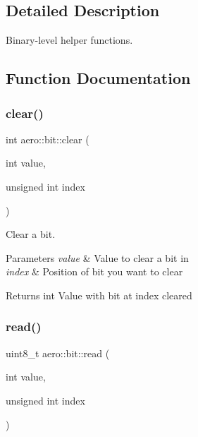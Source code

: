 \subsection{Detailed Description}
Binary-\/level helper functions. 

\subsection{Function Documentation}
\mbox{\label{namespaceaero_1_1bit_a4eed338c347ab1ec13345717315fbf30}} 
\subsubsection{\texorpdfstring{clear()}{clear()}}
{\footnotesize\ttfamily int aero\+::bit\+::clear (\begin{DoxyParamCaption}\item[{int}]{value,  }\item[{unsigned int}]{index }\end{DoxyParamCaption})}



Clear a bit. 


\begin{DoxyParams}{Parameters}
{\em value} & Value to clear a bit in \\
\hline
{\em index} & Position of bit you want to clear \\
\hline
\end{DoxyParams}
\begin{DoxyReturn}{Returns}
int Value with bit at index cleared 
\end{DoxyReturn}
\mbox{\label{namespaceaero_1_1bit_a31644e92c2e3e0c49f7ac4e2088ab5d0}} 
\subsubsection{\texorpdfstring{read()}{read()}}
{\footnotesize\ttfamily uint8\+\_\+t aero\+::bit\+::read (\begin{DoxyParamCaption}\item[{int}]{value,  }\item[{unsigned int}]{index }\end{DoxyParamCaption})}



